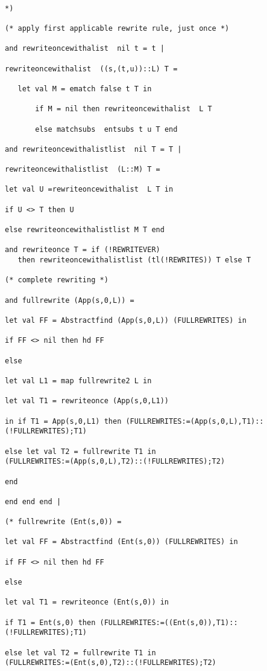 \documentclass{article}
\begin{document}
\begin{verbatim}

*)

(* apply first applicable rewrite rule, just once *)

and rewriteoncewithalist  nil t = t |

rewriteoncewithalist  ((s,(t,u))::L) T =

   let val M = ematch false t T in

       if M = nil then rewriteoncewithalist  L T

       else matchsubs  entsubs t u T end

and rewriteoncewithalistlist  nil T = T |

rewriteoncewithalistlist  (L::M) T =

let val U =rewriteoncewithalist  L T in

if U <> T then U

else rewriteoncewithalistlist M T end

and rewriteonce T = if (!REWRITEVER) 
   then rewriteoncewithalistlist (tl(!REWRITES)) T else T

(* complete rewriting *)

and fullrewrite (App(s,0,L)) =

let val FF = Abstractfind (App(s,0,L)) (FULLREWRITES) in

if FF <> nil then hd FF

else

let val L1 = map fullrewrite2 L in

let val T1 = rewriteonce (App(s,0,L1))

in if T1 = App(s,0,L1) then (FULLREWRITES:=(App(s,0,L),T1)::(!FULLREWRITES);T1)

else let val T2 = fullrewrite T1 in
(FULLREWRITES:=(App(s,0,L),T2)::(!FULLREWRITES);T2)

end

end end end |

(* fullrewrite (Ent(s,0)) = 

let val FF = Abstractfind (Ent(s,0)) (FULLREWRITES) in

if FF <> nil then hd FF

else

let val T1 = rewriteonce (Ent(s,0)) in

if T1 = Ent(s,0) then (FULLREWRITES:=((Ent(s,0)),T1)::(!FULLREWRITES);T1)

else let val T2 = fullrewrite T1 in
(FULLREWRITES:=(Ent(s,0),T2)::(!FULLREWRITES);T2)


\end{verbatim}
\end{document}
